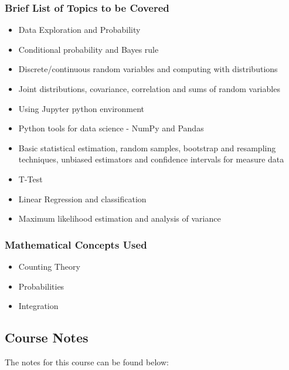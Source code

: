 {\begin{highlight}[\CSPBDataSci]
        \subsubsection*{Brief List of Topics to be Covered}
    
        \begin{itemize}
            \item Data Exploration and Probability
            \item Conditional probability and Bayes rule
            \item Discrete/continuous random variables and computing with distributions
            \item Joint distributions, covariance, correlation and sums of random variables
            \item Using Jupyter python environment
            \item Python tools for data science - NumPy and Pandas
            \item Basic statistical estimation, random samples, bootstrap and resampling techniques, unbiased estimators and confidence intervals for measure data
            \item T-Test
            \item Linear Regression and classification
            \item Maximum likelihood estimation and analysis of variance
        \end{itemize}
        
        \subsubsection*{Mathematical Concepts Used}
        
        \begin{itemize}
            \item Counting Theory
            \item Probabilities
            \item Integration
        \end{itemize}
    \end{highlight}
}

\subsection{Course Notes}

The notes for this course can be found below: \coursedoc{\CSPBDataSciCourseNotes}




